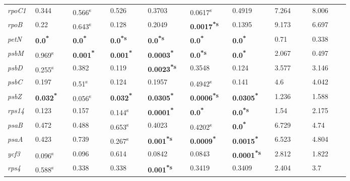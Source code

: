 \documentclass[a4paper]{article}
\begin{document}
\begin{tabular}{p{0.03\linewidth}|p{0.095\linewidth}p{0.095\linewidth}p{0.095\linewidth}|p{0.095\linewidth}p{0.095\linewidth}p{0.095\linewidth}|p{0.095\linewidth}p{0.095\linewidth}}
\textit{rpoC1} & 0.344 & 0.566\textsuperscript{s} & 0.526 & 0.3703 & 0.0617\textsuperscript{s} & 0.4919 & 7.264 & 8.006\\
 \rowcolor{black!20} \textit{rpoB} & 0.22 & 0.643\textsuperscript{s} & 0.128 & 0.2049 & \textbf{0.0017\textsuperscript{*}\textsuperscript{s}} & 0.1395 & 9.173 & 6.697\\
\textit{petN} & \textbf{0.0\textsuperscript{*}} & \textbf{0.0\textsuperscript{*}} & \textbf{0.0\textsuperscript{*}\textsuperscript{s}} & \textbf{0.0\textsuperscript{*}\textsuperscript{s}} & \textbf{0.0\textsuperscript{*}} & \textbf{0.0\textsuperscript{*}} & 0.71 & 0.338\\
 \rowcolor{black!20} \textit{psbM} & 0.969\textsuperscript{s} & \textbf{0.001\textsuperscript{*}} & \textbf{0.001\textsuperscript{*}} & \textbf{0.0003\textsuperscript{*}} & \textbf{0.0\textsuperscript{*}\textsuperscript{s}} & \textbf{0.0\textsuperscript{*}} & 2.067 & 0.497\\
\textit{psbD} & 0.255\textsuperscript{s} & 0.382 & 0.119 & \textbf{0.0023\textsuperscript{*}\textsuperscript{s}} & 0.3548 & 0.124 & 3.577 & 3.146\\
 \rowcolor{black!20} \textit{psbC} & 0.197 & 0.51\textsuperscript{s} & 0.124 & 0.1957 & 0.4942\textsuperscript{s} & 0.141 & 4.6 & 4.042\\
\textit{psbZ} & \textbf{0.032\textsuperscript{*}} & 0.056\textsuperscript{s} & \textbf{0.032\textsuperscript{*}} & \textbf{0.0305\textsuperscript{*}} & \textbf{0.0006\textsuperscript{*}\textsuperscript{s}} & \textbf{0.0305\textsuperscript{*}} & 1.236 & 1.588\\
 \rowcolor{black!20} \textit{rps14} & 0.123 & 0.157 & 0.144\textsuperscript{s} & \textbf{0.0001\textsuperscript{*}} & \textbf{0.0\textsuperscript{*}} & \textbf{0.0\textsuperscript{*}\textsuperscript{s}} & 1.54 & 2.175\\
\textit{psaB} & 0.472 & 0.488 & 0.653\textsuperscript{s} & 0.4023 & 0.4202\textsuperscript{s} & \textbf{0.0\textsuperscript{*}} & 6.729 & 4.74\\
 \rowcolor{black!20} \textit{psaA} & 0.423 & 0.739 & 0.267\textsuperscript{s} & \textbf{0.001\textsuperscript{*}\textsuperscript{s}} & \textbf{0.0009\textsuperscript{*}} & \textbf{0.0015\textsuperscript{*}} & 6.523 & 4.804\\
\textit{ycf3} & 0.096\textsuperscript{s} & 0.096 & 0.614 & 0.0842 & 0.0843 & \textbf{0.0001\textsuperscript{*}\textsuperscript{s}} & 2.812 & 1.822\\
 \rowcolor{black!20} \textit{rps4} & 0.588\textsuperscript{s} & 0.338 & 0.338 & \textbf{0.001\textsuperscript{*}\textsuperscript{s}} & 0.3419 & 0.3409 & 2.404 & 3.7\\

\end{tabular}
\end{document}
